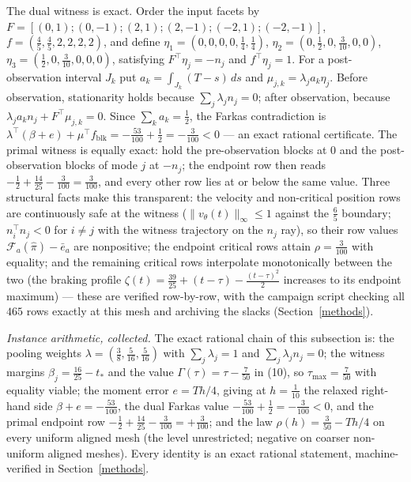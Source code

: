 \documentclass[10pt,twocolumn]{article}
\theoremstyle{plain}
\theoremstyle{definition}
\theoremstyle{remark}
\begin{document}
The dual witness is exact. Order the input facets by
\(F = [(0,1);(0,-1);(2,1);(2,-1);(-2,1);(-2,-1)]\),
\(f = (\tfrac45, \tfrac45, 2, 2, 2, 2)\), and define
\(\eta_1 = (0,0,0,0,\tfrac14,\tfrac14)\),
\(\eta_2 = (0,\tfrac12,0,\tfrac3{10},0,0)\),
\(\eta_3 = (\tfrac12,0,\tfrac3{10},0,0,0)\), satisfying
\(F^\top \eta_j = -n_j\) and \(f^\top \eta_j = 1\). For a post-observation
interval \(J_k\) put \(a_k = \int_{J_k} (T - s)\, ds\) and
\(\mu_{j,k} = \lambda_j a_k \eta_j\). Before observation, stationarity holds
because \(\sum_j \lambda_j n_j = 0\); after observation, because
\(\lambda_j a_k n_j + F^\top \mu_{j,k} = 0\). Since
\(\sum_k a_k = \tfrac12\), the Farkas contradiction is
\(\lambda^\top(\beta + e) + \mu^\top f_{\mathrm{blk}} = -\tfrac{53}{100} +
\tfrac12 = -\tfrac{3}{100} < 0\) --- an exact rational certificate. The
primal witness is equally exact: hold the pre-observation blocks at \(0\) and
the post-observation blocks of mode \(j\) at \(-n_j\); the endpoint row then
reads \(-\tfrac12 + \tfrac{14}{25} - \tfrac{3}{100} = \tfrac{3}{100}\), and
every other row lies at or below the same value. Three structural facts
make this transparent: the velocity and non-critical position rows are
continuously safe at the witness (\(\|v_\theta(t)\|_\infty \le 1\)
against the \(\tfrac65\) boundary; \(n_i^\top n_j < 0\) for
\(i \ne j\) with the witness trajectory on the \(n_j\) ray), so their
row values \(\mathcal F_a(\hat\pi) - \bar e_a\) are nonpositive; the
endpoint critical rows attain \(\rho = \tfrac3{100}\) with equality; and
the remaining critical rows interpolate monotonically between the two
(the braking profile \(\zeta(t) = \tfrac{39}{25} + (t - \tau) -
\tfrac{(t-\tau)^2}{2}\) increases to its endpoint maximum) --- these are
verified row-by-row, with the campaign script checking all \(465\) rows
exactly at this mesh and archiving the slacks
(Section~\ref{methods}).

\emph{Instance arithmetic, collected.} The exact rational chain of this
subsection is: the pooling weights
\(\lambda = (\tfrac38, \tfrac5{16}, \tfrac5{16})\) with
\(\sum_j \lambda_j = 1\) and \(\sum_j \lambda_j n_j = 0\); the
witness margins \(\beta_j = \tfrac{16}{25} - t_*\) and the value
\(\Gamma(\tau) = \tau - \tfrac7{50}\) in (10), so
\(\tau_{\max} = \tfrac7{50}\) with equality viable; the moment error
\(e = Th/4\), giving at \(h = \tfrac1{10}\) the relaxed right-hand
side \(\beta + e = -\tfrac{53}{100}\), the dual Farkas value
\(-\tfrac{53}{100} + \tfrac12 = -\tfrac3{100} < 0\), and the primal
endpoint row \( -\tfrac12 + \tfrac{14}{25} - \tfrac3{100} =
+\tfrac3{100}\); and the law \(\rho(h) = \tfrac3{50} - Th/4\) on every uniform aligned
mesh (the level unrestricted; negative on coarser non-uniform aligned
meshes). Every identity is an
exact rational statement, machine-verified in
Section~\ref{methods}.
\end{document}
